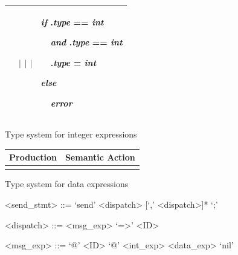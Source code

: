 \begin{itemize}
\begin{figure}[h!]
\begin{tabular*}{1\textwidth}{p{}|p{}}
{~~$\mid$ \tangled{>=} $\mid$ \tangled{\&\&} $\mid$ \tangled{||}
} & \parbox{0.5\textwidth}{
\emph{if} .\emph{type} == \emph{int}

~~\emph{and} .\emph{type} == \emph{int}

~~.\emph{type} = \emph{int}

\emph{else}

~~\emph{error}
}\\

\hline

\end{tabular*}
\caption{Type system for integer expressions}
\end{figure}



\begin{figure}[h!]
\def\arraystretch{2} 
\begin{tabular*}{1\textwidth}{p{}|p{}}
\hline
Production & Semantic Action\\

\hline

\parbox{0.5\textwidth}{

} & \parbox{0.5\textwidth}{

}\\

\hline

\end{tabular*}
\caption{Type system for data expressions}
\end{figure}





\begin{figure}
\begin{grammar}


<send\_stmt> ::= `send' <dispatch> [`,' <dispatch>]*  `;'

<dispatch> ::= <msg\_exp> `=>' <ID>

<msg\_exp> ::= `@' <ID>
           \alt `@' <int\_exp>
           \alt [`?' <ID>] <data\_exp>
           \alt `nil'


\end{grammar}
\end{figure}
\end{itemize}
